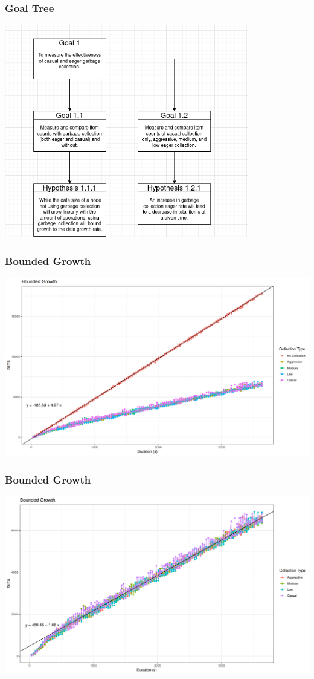 \documentclass{beamer}
\begin{document}
    \begin{frame}[shrink]
        \frametitle{Goal Tree}
        \begin{center}
            \includegraphics[width=0.8\textwidth]{GoalTree}
        \end{center}
    \end{frame}


    \begin{frame}
        \frametitle{Bounded Growth}
        \includegraphics[width=\textwidth]{BoundedGrowth1_2}
    \end{frame}


    \begin{frame}
        \frametitle{Bounded Growth}
        \includegraphics[width=\textwidth]{BoundedGrowth2_2}
    \end{frame}
\end{document}
